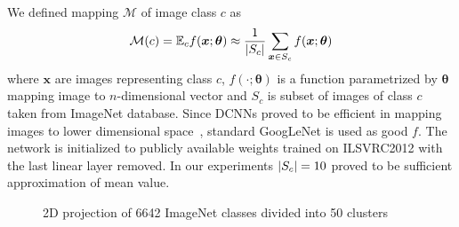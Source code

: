 We defined mapping $\mathcal{M}$ of image class $c$ as
$$
\mathcal{M}(c)=\mathbb{E}_cf(\bm{x};\bm{\theta})\approx\frac{1}{\left|{S_c}\right|}\sum_{\bm{x}\in S_c}f(\bm{x};\bm{\theta})
$$
where $\bm{x}$ are images representing class $c$, $f(\cdot;\bm{\theta})$ is a function parametrized by $\bm{\theta}$ mapping image to $n$-dimensional vector and $S_c$ is subset of images of class $c$ taken from ImageNet database. Since DCNNs proved to be efficient in mapping images to lower dimensional space~\cite{donahue2014decaf}, standard GoogLeNet is used as good $f$. The network is initialized to publicly available weights \cite{TFmodels} trained on ILSVRC2012 with the last linear layer removed. In our experiments $\left|{S_c}\right|=10$ proved to be sufficient approximation of mean value.



\begin{figure}
	\centering
	\scalebox{0.8}{}
	\caption[Projection of ImageNet classes into 2D]{2D projection of 6642 ImageNet classes divided into 50 clusters}
	\label{fig:dataset_clusters}
\end{figure}